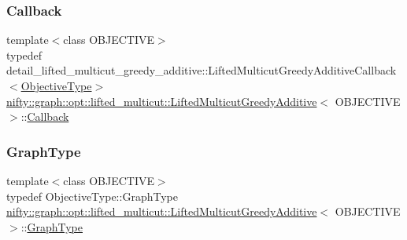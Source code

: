 \mbox{\label{classnifty_1_1graph_1_1opt_1_1lifted__multicut_1_1LiftedMulticutGreedyAdditive_a70cf9bac7d42756343ae2e47877867e4}} 
\subsubsection{\texorpdfstring{Callback}{Callback}}
{\footnotesize\ttfamily template$<$class O\+B\+J\+E\+C\+T\+I\+VE$>$ \\
typedef detail\+\_\+lifted\+\_\+multicut\+\_\+greedy\+\_\+additive\+::\+Lifted\+Multicut\+Greedy\+Additive\+Callback$<$\hyperlink{classnifty_1_1graph_1_1opt_1_1lifted__multicut_1_1LiftedMulticutGreedyAdditive_a0aa12ac484718da875bfca390b69811e}{Objective\+Type}$>$ \hyperlink{classnifty_1_1graph_1_1opt_1_1lifted__multicut_1_1LiftedMulticutGreedyAdditive}{nifty\+::graph\+::opt\+::lifted\+\_\+multicut\+::\+Lifted\+Multicut\+Greedy\+Additive}$<$ O\+B\+J\+E\+C\+T\+I\+VE $>$\+::\hyperlink{classnifty_1_1graph_1_1opt_1_1lifted__multicut_1_1LiftedMulticutGreedyAdditive_a70cf9bac7d42756343ae2e47877867e4}{Callback}}

\mbox{\label{classnifty_1_1graph_1_1opt_1_1lifted__multicut_1_1LiftedMulticutGreedyAdditive_ac29b23b48b0b82a2eb86e0d813f09515}} 
\subsubsection{\texorpdfstring{Graph\+Type}{GraphType}}
{\footnotesize\ttfamily template$<$class O\+B\+J\+E\+C\+T\+I\+VE$>$ \\
typedef Objective\+Type\+::\+Graph\+Type \hyperlink{classnifty_1_1graph_1_1opt_1_1lifted__multicut_1_1LiftedMulticutGreedyAdditive}{nifty\+::graph\+::opt\+::lifted\+\_\+multicut\+::\+Lifted\+Multicut\+Greedy\+Additive}$<$ O\+B\+J\+E\+C\+T\+I\+VE $>$\+::\hyperlink{classnifty_1_1graph_1_1opt_1_1lifted__multicut_1_1LiftedMulticutGreedyAdditive_ac29b23b48b0b82a2eb86e0d813f09515}{Graph\+Type}}


